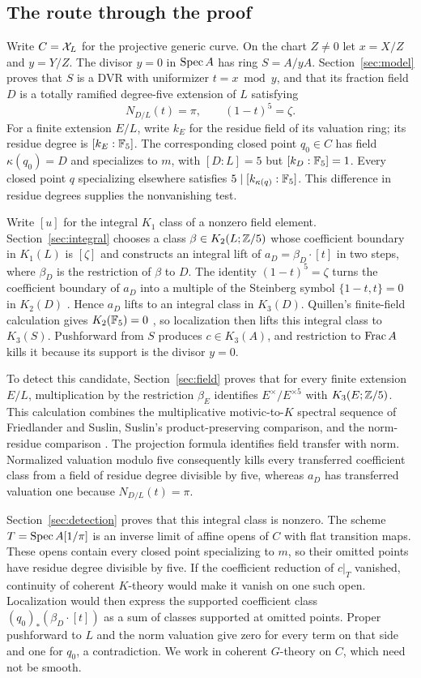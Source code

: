 \subsection*{The route through the proof}

Write $C=\mathcal X_L$ for the projective generic curve. On the chart $Z\ne0$
let $x=X/Z$ and $y=Y/Z$. The divisor $y=0$ in $\operatorname{Spec} A$ has ring
$S=A/yA$. Section~\ref{sec:model} proves that $S$ is a DVR with
uniformizer $t=x\bmod y$, and that its fraction field $D$ is a totally
ramified degree-five extension of $L$ satisfying
\[
 N_{D/L}(t)=\pi,\qquad (1-t)^5=\zeta.
\]
For a finite extension $E/L$, write $k_E$ for the residue field of
its valuation ring; its residue degree is $[k_E:\mathbb F_5]$.
The corresponding closed point $q_0\in C$ has field
$\kappa(q_0)=D$ and specializes to $m$, with
$[D:L]=5$ but $[k_D:\mathbb F_5]=1$. Every closed point $q$ specializing
elsewhere satisfies $5\mid[k_{\kappa(q)}:\mathbb F_5]$.
This difference in residue degrees supplies the nonvanishing test.

Write $[u]$ for the integral $K_1$ class of a nonzero field element.
Section~\ref{sec:integral} chooses a class
$\beta\in K_2(L;\mathbb Z/5)$ whose coefficient boundary in $K_1(L)$ is
$[\zeta]$ and
constructs an integral lift of $a_D=\beta_D\cdot[t]$ in two steps,
where $\beta_D$ is the restriction of $\beta$ to $D$.
The identity $(1-t)^5=\zeta$ turns the coefficient boundary of
$a_D$ into a multiple of the Steinberg symbol
$\{1-t,t\}=0$ in $K_2(D)$ \cite{Matsumoto}. Hence $a_D$ lifts
to an integral class in $K_3(D)$. Quillen's finite-field
calculation gives $K_2(\mathbb F_5)=0$ \cite{QuillenFinite}, so localization
then lifts this integral class to $K_3(S)$. Pushforward from $S$
produces $c\in K_3(A)$, and restriction to $\operatorname{Frac} A$ kills it
because its support is the divisor $y=0$.

To detect this candidate, Section~\ref{sec:field} proves that for
every finite extension $E/L$, multiplication by the restriction
$\beta_E$ identifies $E^\times/E^{\times5}$ with
$K_3(E;\mathbb Z/5)$. This calculation combines the multiplicative
motivic-to-$K$ spectral sequence of Friedlander and Suslin,
Suslin's product-preserving comparison, and the norm-residue comparison
\cite{FriedlanderSuslin,Suslin,Voevodsky}. The projection formula
identifies field transfer with norm. Normalized valuation modulo
five consequently kills every transferred coefficient class from
a field of residue degree divisible by five, whereas $a_D$ has
transferred valuation one because $N_{D/L}(t)=\pi$.

Section~\ref{sec:detection} proves that this integral class is
nonzero. The scheme $T=\operatorname{Spec} A[1/\pi]$ is an inverse limit of
affine opens of $C$ with flat transition maps. These opens contain
every closed point specializing to $m$, so their omitted points have
residue degree divisible by five. If the coefficient
reduction of $c|_T$ vanished, continuity of coherent $K$-theory
would make it vanish on one such open. Localization
would then express the supported coefficient class
$(q_0)_*(\beta_D\cdot[t])$ as a sum of classes supported at omitted
points. Proper pushforward to $L$ and the norm valuation
give zero for every term on that side and one for $q_0$, a contradiction.
We work in coherent $G$-theory on $C$, which need not be smooth.
